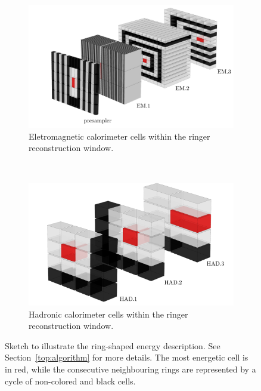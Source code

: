 \begin{figure}[h!t]
	\centering
	\begin{center}
		\begin{subfigure}[c]{0.8\textwidth}
			\centering
			\includegraphics[width=\textwidth]{sections/ringer/figures/ATLAS_EM_Layers_v5.pdf}
			\caption{Eletromagnetic calorimeter cells within the ringer reconstruction window.}
		\end{subfigure} \\
		\begin{subfigure}[c]{0.8\textwidth}
			\centering
			\includegraphics[width=\textwidth]{sections/ringer/figures/ATLAS_HAD_Layers_v5.pdf}
			\caption{Hadronic calorimeter cells within the ringer reconstruction window.}
		\end{subfigure}
	\end{center}
	\caption{\label{fig:calo_rings}
		Sketch to illustrate the ring-shaped energy description. See
		Section~\ref{top:algorithm} for more details. 
		The most energetic cell is in red, while the consecutive neighbouring rings are represented by a cycle 
		of non-colored and black cells.
	}
\end{figure}




